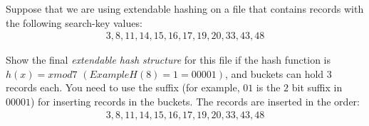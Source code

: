 


\question Suppose that we are using extendable hashing on a file that contains 
records with the following search-key values:
\begin{align}
  3, 8, 11, 14, 15, 16, 17, 19, 20, 33, 43, 48
\end{align}

Show the final \textit{extendable hash structure} for this file if the hash function is 
$h(x) = x mod 7$ $(Example H(8) = 1 = 00001)$, and buckets can hold $3$ records each. 
You need to use the suffix (for example, $01$ is the $2$ bit suffix in $00001$) for 
inserting records in the buckets. The records are inserted in the order: 
\begin{align}
  3, 8, 11, 14, 15, 16, 17, 19, 20, 33, 43, 48
\end{align}


\begin{solution}
\end{solution}
